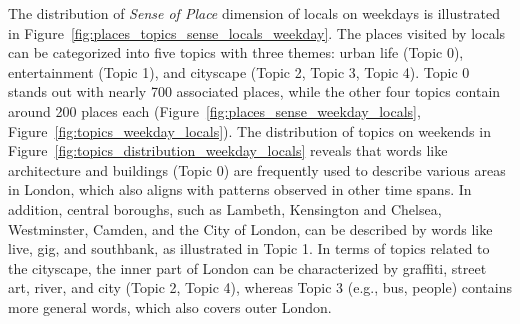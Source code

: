 \documentclass{article}
\theoremstyle{remark}
\begin{document}
The distribution of \textit{Sense of Place} dimension of locals on weekdays is illustrated in Figure~\ref{fig:places_topics_sense_locals_weekday}. The places visited by locals can be categorized into five topics with three themes: urban life (Topic 0), entertainment (Topic 1), and cityscape (Topic 2, Topic 3, Topic 4). Topic 0 stands out with nearly 700 associated places, while the other four topics contain around 200 places each (Figure~\ref{fig:places_sense_weekday_locals}, Figure~\ref{fig:topics_weekday_locals}). The distribution of topics on weekends in Figure~\ref{fig:topics_distribution_weekday_locals} reveals that words like architecture and buildings (Topic 0) are frequently used to describe various areas in London, which also aligns with patterns observed in other time spans. In addition, central boroughs, such as Lambeth, Kensington and Chelsea, Westminster, Camden, and the City of London, can be described by words like live, gig, and southbank, as illustrated in Topic 1. In terms of topics related to the cityscape, the inner part of London can be characterized by graffiti, street art, river, and city (Topic 2, Topic 4), whereas Topic 3 (e.g., bus, people) contains more general words, which also covers outer London.
\end{document}
